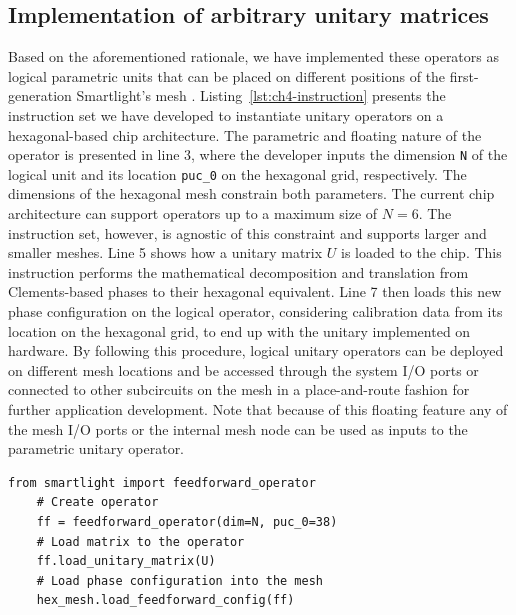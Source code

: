 \subsection{Implementation of arbitrary unitary matrices}\label{sub:implementation_of_arbitrary_unitary_matrices} %

Based on the aforementioned rationale, we have implemented these operators as logical parametric units that can be placed on different positions of the first-generation Smartlight's mesh \cite{perez-lopez_general-purpose_2024}.
Listing~\ref{lst:ch4-instruction} presents the instruction set we have developed to instantiate unitary operators on a hexagonal-based chip architecture.
The parametric and floating nature of the operator is presented in line 3, where the developer inputs the dimension \lstinline|N| of the logical unit and its location \lstinline|puc_0| on the hexagonal grid, respectively.
The dimensions of the hexagonal mesh constrain both parameters.
The current chip architecture can support operators up to a maximum size of $N = 6$.
The instruction set, however, is agnostic of this constraint and supports larger and smaller meshes.
Line 5 shows how a unitary matrix $U$ is loaded to the chip.
This instruction performs the mathematical decomposition and translation from Clements-based phases to their hexagonal equivalent.
Line 7 then loads this new phase configuration on the logical operator, considering calibration data from its location on the hexagonal grid, to end up with the unitary implemented on hardware.
By following this procedure, logical unitary operators can be deployed on different mesh locations and be accessed through the system I/O ports or connected to other subcircuits on the mesh in a place-and-route fashion for further application development.
Note that because of this floating feature any of the mesh I/O ports or the internal mesh node can be used as inputs to the parametric unitary operator.

\begin{lstlisting}[caption={Basic instruction set needed to implement matrix operators on the first-generation Smartlight}, label={lst:ch4-instruction}]
	from smartlight import feedforward_operator
	# Create operator
	ff = feedforward_operator(dim=N, puc_0=38)
	# Load matrix to the operator
	ff.load_unitary_matrix(U)
	# Load phase configuration into the mesh
	hex_mesh.load_feedforward_config(ff)
\end{lstlisting}

